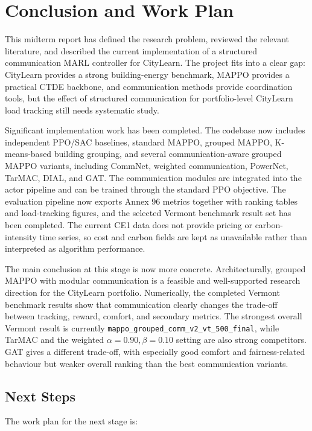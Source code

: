 ﻿\chapter{Conclusion and Work Plan}\label{ch:concl}

This midterm report has defined the research problem, reviewed the relevant
literature, and described the current implementation of a structured
communication MARL controller for CityLearn. The project fits into a clear gap:
CityLearn provides a strong building-energy benchmark, MAPPO provides a
practical CTDE backbone, and communication methods provide coordination tools,
but the effect of structured communication for portfolio-level CityLearn load
tracking still needs systematic study.

Significant implementation work has been completed. The codebase now includes
independent PPO/SAC baselines, standard MAPPO, grouped MAPPO, K-means-based
building grouping, and several communication-aware grouped MAPPO variants,
including CommNet, weighted communication, PowerNet, TarMAC, DIAL, and GAT. The
communication modules are integrated into the actor pipeline and can be trained
through the standard PPO objective. The evaluation pipeline now exports Annex 96
metrics together with ranking tables and load-tracking figures, and the selected
Vermont benchmark result set has been completed. The current CE1 data does not
provide pricing or carbon-intensity time series, so cost and carbon fields are
kept as unavailable rather than interpreted as algorithm performance.

The main conclusion at this stage is now more concrete. Architecturally, grouped
MAPPO with modular communication is a feasible and well-supported research
direction for the CityLearn portfolio. Numerically, the completed Vermont
benchmark results show that communication clearly changes the trade-off between
tracking, reward, comfort, and secondary metrics. The strongest overall Vermont
result is currently \texttt{mappo\_grouped\_comm\_v2\_vt\_500\_final}, while
TarMAC and the weighted \mbox{$\alpha=0.90, \beta=0.10$} setting are also strong
competitors. GAT gives a different trade-off, with especially good comfort and
fairness-related behaviour but weaker overall ranking than the best
communication variants.

\section{Next Steps}

The work plan for the next stage is:


